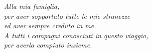 
\pagestyle{empty}
\vspace*{140pt}
\begin{flushright}
\emph{
Alla mia famiglia,\\
per aver sopportato tutte le mie stranezze\\
ed aver sempre creduto in me.\\
A tutti i compagni conosciuti in questo viaggio,\\
per averlo compiuto insieme.
}
\end{flushright}
\newpage
